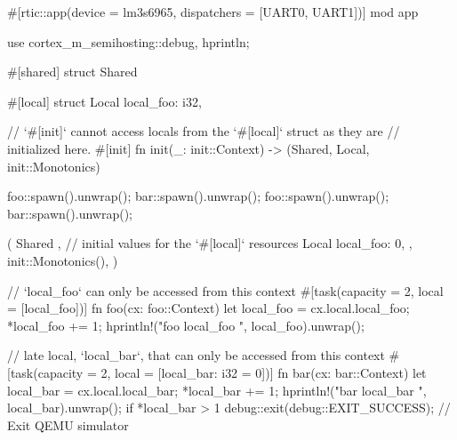 #[rtic::app(device = lm3s6965, dispatchers = [UART0, UART1])]
mod app {
    use cortex_m_semihosting::{debug, hprintln};

    #[shared]
    struct Shared {}

    #[local]
    struct Local {
        local_foo: i32,
    }

    // `#[init]` cannot access locals from the `#[local]` struct as they are 
    // initialized here.
    #[init]
    fn init(_: init::Context) -> (Shared, Local, init::Monotonics) {
        foo::spawn().unwrap();
        bar::spawn().unwrap();
        foo::spawn().unwrap();
        bar::spawn().unwrap();

        (
            Shared {},
            // initial values for the `#[local]` resources
            Local {
                local_foo: 0,
            },
            init::Monotonics(),
        )
    }

    // `local_foo` can only be accessed from this context
    #[task(capacity = 2, local = [local_foo])]
    fn foo(cx: foo::Context) {
        let local_foo = cx.local.local_foo;
        *local_foo += 1;
        hprintln!("foo local_foo {}", local_foo).unwrap();
    }

    // late local, `local_bar`, that can only be accessed from this context
    #[task(capacity = 2, local = [local_bar: i32 = 0])]
    fn bar(cx: bar::Context) {
        let local_bar = cx.local.local_bar;
        *local_bar += 1;
        hprintln!("bar local_bar {}", local_bar).unwrap();
        if *local_bar > 1{
            debug::exit(debug::EXIT_SUCCESS); // Exit QEMU simulator
        }
    }
}
